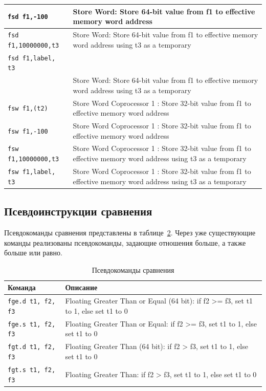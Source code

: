 \begin{table}[h]
\begin{tabularx}{\textwidth}{|l|X|}
        \hline \verb|fsd f1,-100 | & Store Word: Store 64-bit value from f1 to effective memory word address \\
        \hline \verb|fsd f1,10000000,t3| & Store Word: Store 64-bit value from f1 to effective memory word address using t3 as a temporary \\
        \hline \verb|fsd f1,label, t3| &  \\
        \hline \verb|| & Store Word: Store 64-bit value from f1 to effective memory word address using t3 as a temporary \\
        \hline \verb|fsw f1,(t2)| & Store Word Coprocessor 1 : Store 32-bit value from f1 to effective memory word address \\
        \hline \verb|fsw f1,-100| & Store Word Coprocessor 1 : Store 32-bit value from f1 to effective memory word address \\
        \hline \verb|fsw f1,10000000,t3| & Store Word Coprocessor 1 : Store 32-bit value from f1 to effective memory word address using t3 as a temporary \\
        \hline \verb|fsw f1,label, t3| & Store Word Coprocessor 1 : Store 32-bit value from f1 to effective memory word address using t3 as a temporary \\
        \hline
    \end{tabularx}
    \label{table-fp-pseudo-mov-load-store}
\end{table}

\subsection{Псевдоинструкции сравнения}

Псевдокоманды сравнения представлены в таблице~\ref{table-fp-pseudo-cmp}. Через уже существующие команды реализованы псевдокоманды, задающие отношения больше, а также больше или равно.

\begin{table}[h]
    \caption{Псевдокоманды сравнения}
    \centering
    \begin{tabularx}{\textwidth}{|l|X|}
        \hline
        \textbf{Команда} & \textbf{Описание} \\
        \hline \verb|fge.d t1, f2, f3| & Floating Greater Than or Equal (64 bit): if f2 >= f3, set t1 to 1, else set t1 to 0 \\
        \hline \verb|fge.s t1, f2, f3| & Floating Greater Than or Equal: if f2 >= f3, set t1 to 1, else set t1 to 0 \\
        \hline \verb|fgt.d t1, f2, f3| & Floating Greater Than (64 bit): if f2 > f3, set t1 to 1, else set t1 to 0 \\
        \hline \verb|fgt.s t1, f2, f3| & Floating Greater Than: if f2 > f3, set t1 to 1, else set t1 to 0 \\
        \hline
    \end{tabularx}
    \label{table-fp-pseudo-cmp}
\end{table}

